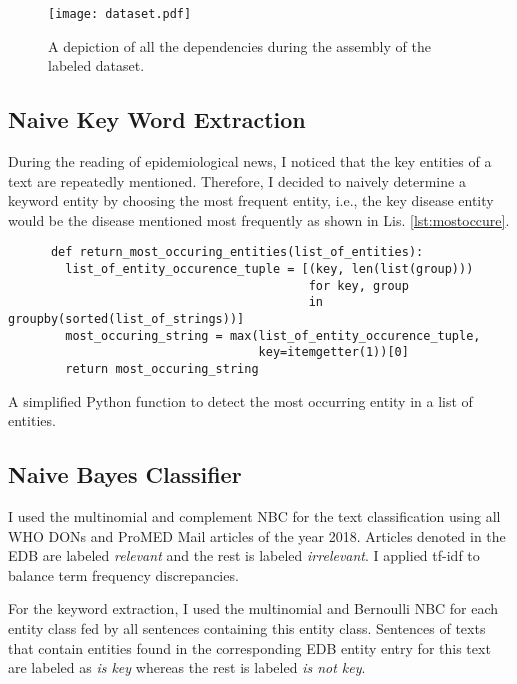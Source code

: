   \begin{figure}[h!]
    \centering
    \texttt{[image: dataset.pdf]}
    \caption{A depiction of all the dependencies during the assembly of the labeled dataset.}
    \label{fig:dataset}
  \end{figure}


\subsection{Naive Key Word Extraction}
  During the reading of epidemiological news, I noticed that the key entities of a text are repeatedly mentioned.
  Therefore, I decided to naively determine a keyword entity by choosing the most frequent entity, i.e., the key disease entity would be the disease mentioned most frequently as shown in Lis. \ref{lst:mostoccure}.
  \begin{listing}[h!]
    \begin{verbatim}
      def return_most_occuring_entities(list_of_entities):
        list_of_entity_occurence_tuple = [(key, len(list(group)))
                                          for key, group
                                          in groupby(sorted(list_of_strings))]
        most_occuring_string = max(list_of_entity_occurence_tuple,
                                   key=itemgetter(1))[0]
        return most_occuring_string
    \end{verbatim}
    \caption{A simplified Python function to detect the most occurring entity in a list of entities.}
    \label{lst:mostoccure}
  \end{listing}

\subsection{Naive Bayes Classifier}\label{iskey}
  I used the multinomial and complement NBC for the text classification using all WHO DONs and ProMED Mail articles of the year 2018.
  Articles denoted in the EDB are labeled \textsl{relevant} and the rest is labeled \textsl{irrelevant}.
  I applied tf-idf to balance term frequency discrepancies.

  For the keyword extraction, I used the multinomial and Bernoulli NBC for each entity class fed by all sentences containing this entity class.
  Sentences of texts that contain entities found in the corresponding EDB entity entry for this text are labeled as \textsl{is key} whereas the rest is labeled \textsl{is not key}.

